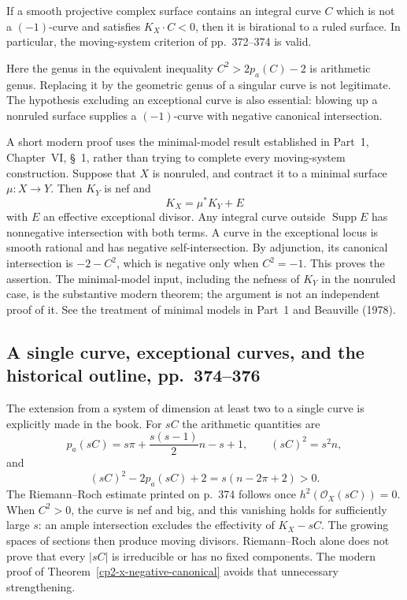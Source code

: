 \begin{theorem}
\label{cp2-x-negative-canonical}
If a smooth projective complex surface contains an integral curve $C$ which is not a $(-1)$-curve and satisfies $K_X\cdot C<0$, then it is birational to a ruled surface. In particular, the moving-system criterion of pp.~372--374 is valid.
\end{theorem}

Here the genus in the equivalent inequality $C^2>2p_a(C)-2$ is arithmetic genus. Replacing it by the geometric genus of a singular curve is not legitimate. The hypothesis excluding an exceptional curve is also essential: blowing up a nonruled surface supplies a $(-1)$-curve with negative canonical intersection.

A short modern proof uses the minimal-model result established in Part~1, Chapter~VI, \S~1, rather than trying to complete every moving-system construction. Suppose that $X$ is nonruled, and contract it to a minimal surface $\mu:X\to Y$. Then $K_Y$ is nef and
\[
 K_X=\mu^*K_Y+E
\]
with $E$ an effective exceptional divisor. Any integral curve outside $\operatorname{Supp}E$ has nonnegative intersection with both terms. A curve in the exceptional locus is smooth rational and has negative self-intersection. By adjunction, its canonical intersection is $-2-C^2$, which is negative only when $C^2=-1$. This proves the assertion. The minimal-model input, including the nefness of $K_Y$ in the nonruled case, is the substantive modern theorem; the argument is not an independent proof of it. See the treatment of minimal models in Part~1 and Beauville (1978).

\subsection{A single curve, exceptional curves, and the historical outline, pp.~374--376}

The extension from a system of dimension at least two to a single curve is explicitly made in the book. For $sC$ the arithmetic quantities are
\[
 p_a(sC)=s\pi+\frac{s(s-1)}2n-s+1,\qquad (sC)^2=s^2n,
\]
and
\[
 (sC)^2-2p_a(sC)+2=s(n-2\pi+2)>0.
\]
The Riemann--Roch estimate printed on p.~374 follows once $h^2(\mathcal O_X(sC))=0$. When $C^2>0$, the curve is nef and big, and this vanishing holds for sufficiently large $s$: an ample intersection excludes the effectivity of $K_X-sC$. The growing spaces of sections then produce moving divisors. Riemann--Roch alone does not prove that every $|sC|$ is irreducible or has no fixed components. The modern proof of Theorem~\ref{cp2-x-negative-canonical} avoids that unnecessary strengthening.

